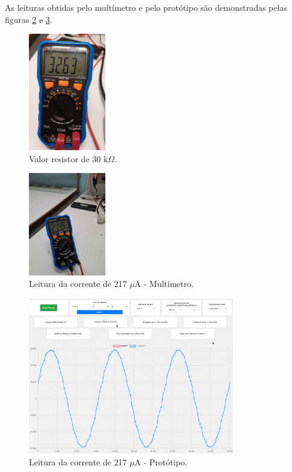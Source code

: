 As leituras obtidas pelo multímetro e pelo protótipo são demonstradas pelas figuras \ref{fig:leitura-micro-mult} e \ref{fig:leitura-micro-boy-onda}.

\begin{figure}[htb!]
    \caption{Valor resistor de 30 k$\Omega$.}
    \label{fig:res-30k}
    \includegraphics[width=0.3\textwidth]{figuras/res-30k.png}
    \fonte{}
\end{figure}

\begin{figure}[htb!]
    \caption{Leitura da corrente de 217 $\mu$A - Multímetro.}
    \label{fig:leitura-micro-mult}
    \includegraphics[width=0.3\textwidth]{figuras/leitura-micro-mult.jpg}
    \fonte{}
\end{figure}

\begin{figure}[htb!]
    \caption{Leitura da corrente de 217 $\mu$A - Protótipo.}
    \label{fig:leitura-micro-boy-onda}
    \includegraphics[width=0.8\textwidth]{figuras/leitura-micro-boy-onda.png}
    \fonte{}
\end{figure}


